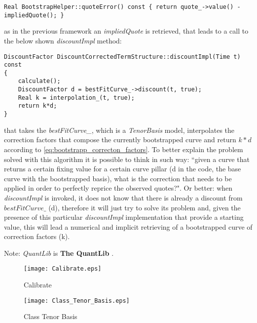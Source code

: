\begin{lstlisting}
Real BootstrapHelper::quoteError() const { return quote_->value() - impliedQuote(); }
\end{lstlisting}

as in the previous framework an \textit{impliedQuote} is retrieved, that leads to a call to the below shown \textit{discountImpl} method:

\begin{lstlisting}
DiscountFactor DiscountCorrectedTermStructure::discountImpl(Time t) const
{
    calculate();
    DiscountFactor d = bestFitCurve_->discount(t, true);
    Real k = interpolation_(t, true);
    return k*d;
}
\end{lstlisting} 

that takes the \textit{bestFitCurve\_}, which is a \textit{TenorBasis} model, interpolates the correction factors that compose the currently bootstrapped curve and return \textit{$k*d$} according to \eqref{eq:bootstrapp_correcton_factors}. 
To better explain the problem solved with this algorithm it is possible to think in such way: ``given a curve that returns a certain fixing value for a certain curve pillar (d in the code, the base curve with the bootstrapped basis), what is the correction that needs to be applied in order to perfectly reprice the observed quotes?". Or better: when \textit{discountImpl} is invoked, it does not know that there is already a discount from $bestFitCurve\_$ (d), therefore it will just try to solve its problem and, given the presence of this particular \textit{discountImpl} implementation that provide a starting value, this will lead a numerical and implicit retrieving of a bootstrapped curve of correction factors (k).


Note:\textit{ QuantLib} is \textbf{The QuantLib} \cite{ballabio_implementing_quantlib}.


\begin{figure}[H]
\centering
\texttt{[image: Calibrate.eps]}
\caption{Calibrate}
\label{fig:calibrate}
\end{figure}

\begin{figure}[H]
\centering
\texttt{[image: Class\_Tenor\_Basis.eps]}
\caption{Class Tenor Basis}
\label{fig:class_tenor_basis}
\end{figure}

